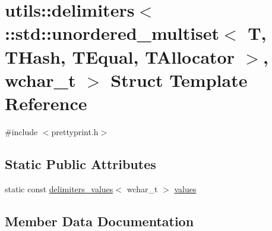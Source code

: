 \hypertarget{structutils_1_1delimiters_3_01_1_1std_1_1unordered__multiset_3_01_t_00_01_t_hash_00_01_t_equal_0dd8c4434f263cab40f3b55ed479207a0}{}\section{utils\+::delimiters$<$ \+::std\+::unordered\+\_\+multiset$<$ T, T\+Hash, T\+Equal, T\+Allocator $>$, wchar\+\_\+t $>$ Struct Template Reference}
\label{structutils_1_1delimiters_3_01_1_1std_1_1unordered__multiset_3_01_t_00_01_t_hash_00_01_t_equal_0dd8c4434f263cab40f3b55ed479207a0}


{\ttfamily \#include $<$prettyprint.\+h$>$}

\subsection*{Static Public Attributes}
\begin{DoxyCompactItemize}
\item 
static const \mbox{\hyperlink{structutils_1_1delimiters__values}{delimiters\+\_\+values}}$<$ wchar\+\_\+t $>$ \mbox{\hyperlink{structutils_1_1delimiters_3_01_1_1std_1_1unordered__multiset_3_01_t_00_01_t_hash_00_01_t_equal_0dd8c4434f263cab40f3b55ed479207a0_ae361e6c5eeea0ca9a543df2c3ed851a1}{values}}
\end{DoxyCompactItemize}


\subsection{Member Data Documentation}
\mbox{\label{structutils_1_1delimiters_3_01_1_1std_1_1unordered__multiset_3_01_t_00_01_t_hash_00_01_t_equal_0dd8c4434f263cab40f3b55ed479207a0_ae361e6c5eeea0ca9a543df2c3ed851a1}} 
